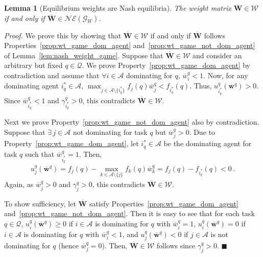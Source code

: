\documentclass{IEEEtran}
\newcommand{\Mcal}[1]{\mathcal{#1}}
\newcommand{\Mc}[1]{\mathcal{#1}}
\newcommand{\bld}[1]{\mathbf{#1}}
\newtheorem{lemma}[theorem]{Lemma}
\newcommand{\squaresym}{\hbox{$\blacksquare$}}
\newcommand{\proofend}{\relax\ifmmode\else\unskip\hfill\fi\squaresym}
\renewenvironment{proof}{\textit{Proof.} }{\proofend}
\renewcommand{\bar}[1]{\overline{#1}}
\def \agt{\Mcal{A}}
\def \eqpt{\Mcal{W}}
\def \game{\mathscr{G}}
\def \ne{\Mc{NE}}
\def \tsk{\Mc{Q}}
\def \w{\bld{w}}
\def \W{\bld{W}}
\def \wb{\overline{\w}}
\def \Wb{\bar{\W}}
\def \wbar{\overline{w}}
\begin{document}
\begin{lemma}[Equilibrium weights are Nash equilibria] \label{lem:max_dyn_eq}
The weight matrix $\bar{\W} \in \eqpt$ if and only if $\bar{\W} \in \ne(\game_W)$.
\end{lemma}
\begin{proof}
  We prove this by showing that $\bar{\W} \in \eqpt$ if and only if
  $\Wb$ follows Properties~\ref{prop:wt_game_dom_agent}
  and~\ref{prop:wt_game_not_dom_agent} of
  Lemma~\ref{lem:nash_weight_game}.
Suppose that $\bar{\W} \in \eqpt$ and consider an arbitrary but fixed $q \in \tsk$. 
We prove Property~\ref{prop:wt_game_dom_agent} by contradiction and
assume that $\forall i \in \agt$ dominating for $q$, $\bar{w}^q_i <
1$. Now, for any dominating agent $i^*_q \in \agt$,
$\max_{j \in \agt \setminus \{i^*_q\}}f_j(q)\wbar^q_j < f_{i^*_q}(q)$.
Thus, $u^q_{i^*_q}(\wb^q) > 0$. Since $\wbar^q_{i^*_q} < 1$ and
$\gamma^q_{i^*_q} > 0$, this contradicts $\Wb \in \eqpt$.

Next we prove Property~\ref{prop:wt_game_not_dom_agent} also by
contradiction. Suppose that $\exists \,j \in \agt$ not dominating for
task $q$ but $\bar{w}^q_j > 0$. Due to
Property~\ref{prop:wt_game_dom_agent}, let $i^*_q \in \agt$ be the
dominating agent for task $q$ such that $\wbar^q_{i^*_q} = 1$. Then,
\begin{align*}
  u^q_j(\wb^q) = f_j(q) - \max_{k \in \agt \setminus \{j\}} f_k(q) \wbar^q_k = f_j(q) - f_{i^*_q}(q) < 0\,.
\end{align*}
Again, as $\bar{w}^q_j > 0$ and $\gamma^q_j > 0$, this contradicts
$\Wb \in
\eqpt$. %

To show sufficiency, let $\Wb$ satisfy
Properties~\ref{prop:wt_game_dom_agent}
and~\ref{prop:wt_game_not_dom_agent}. Then it is easy to see that for
each task $q \in \tsk$, $u^q_i(\wb^q) \geq 0$ if $i \in \agt$ is dominating
for $q$ with $\wbar^q_i = 1$, $u^q_i(\wb^q) = 0$ if $i \in \agt$ is dominating
for $q$ with $\wbar^q_i < 1$, and $u^q_j(\wb^q) < 0$ if $j \in \agt$ is not dominating for $q$ (hence $\wbar^q_j = 0$). Then, $\Wb \in \eqpt$ follows since $\gamma^q_j >
0$. %
\end{proof}
\end{document}
